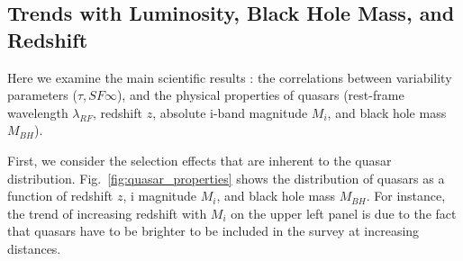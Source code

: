 \documentclass[twocolumn]{aastex62}
\begin{document}
\subsection{Trends with Luminosity, Black Hole Mass, and Redshift}

Here we examine the main scientific results : the correlations between variability parameters  ($\tau, SF{\infty}$), and the physical properties of quasars (rest-frame wavelength $\lambda_{RF}$, redshift $z$, absolute i-band magnitude $M_{i}$, and black hole mass $M_{BH}$). 

First, we consider the selection effects that are inherent to the quasar distribution. Fig.~\ref{fig:quasar_properties} shows the distribution of quasars as a function of redshift $z$, i magnitude $M_{i}$, and black hole mass $M_{BH}$. For instance, the trend of increasing redshift with $M_{i}$ on the upper left panel is due to the fact that quasars have to be brighter to be included in the survey at increasing distances. 
\end{document}
